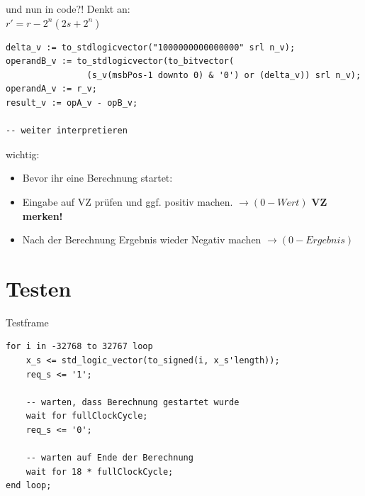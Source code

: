 \documentclass[aspectratio=169,presentation]{beamer}
\begin{document}
\begin{frame} [fragile] {und nun in code?!}
	Denkt an: \\
	$r' = r - 2^n (2s + 2^n)$
	\vspace{0.3cm}
	\begin{lstlisting}
delta_v := to_stdlogicvector("1000000000000000" srl n_v);
operandB_v := to_stdlogicvector(to_bitvector(
				(s_v(msbPos-1 downto 0) & '0') or (delta_v)) srl n_v);
operandA_v := r_v;
result_v := opA_v - opB_v;

-- weiter interpretieren
	\end{lstlisting}
\end{frame}


\begin{frame}
	wichtig:
	\begin{itemize}
		\item Bevor ihr eine Berechnung startet:
		\item Eingabe auf VZ prüfen und ggf. positiv machen. $\rightarrow (0-Wert)$ \textbf{VZ merken!}
		\item Nach der Berechnung Ergebnis wieder Negativ machen $\rightarrow (0-Ergebnis)$
	\end{itemize}
\end{frame}


\section{Testen}
\begin{frame} [fragile] {Testframe}
	\begin{lstlisting}
for i in -32768 to 32767 loop
	x_s <= std_logic_vector(to_signed(i, x_s'length));
	req_s <= '1'; 

	-- warten, dass Berechnung gestartet wurde
	wait for fullClockCycle;
	req_s <= '0';

	-- warten auf Ende der Berechnung
	wait for 18 * fullClockCycle;
end loop;
	\end{lstlisting}
\end{frame}
\end{document}
